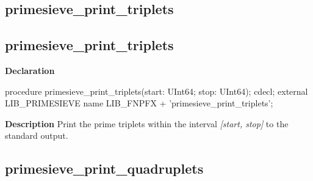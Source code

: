 \documentclass{report}
\newif\ifpdf
\begin{document}
\subsection*{\large{\textbf{primesieve{\_}print{\_}triplets}}\normalsize\hspace{1ex}\hrulefill}
\else
\subsection*{primesieve{\_}print{\_}triplets}
\fi
\label{primesieve-primesieve_print_triplets}
\begin{list}{}{
\setlength{\itemindent}{0cm}
\setlength{\listparindent}{0cm}
\setlength{\leftmargin}{\evensidemargin}
\addtolength{\leftmargin}{\tmplength}
\settowidth{\labelsep}{X}
\addtolength{\leftmargin}{\labelsep}
\setlength{\labelwidth}{\tmplength}
}
\item[\textbf{Declaration}\hfill]
\ifpdf
\begin{flushleft}
\fi
\begin{ttfamily}
procedure primesieve{\_}print{\_}triplets(start: UInt64; stop: UInt64); cdecl; external LIB{\_}PRIMESIEVE name LIB{\_}FNPFX + 'primesieve{\_}print{\_}triplets';\end{ttfamily}

\ifpdf
\end{flushleft}
\fi

\par
\item[\textbf{Description}]
Print the prime triplets within the interval \textit{[start, stop]} to the standard output.

\end{list}
\ifpdf
\subsection*{\large{\textbf{primesieve{\_}print{\_}quadruplets}}\normalsize\hspace{1ex}\hrulefill}
\else
\end{document}
